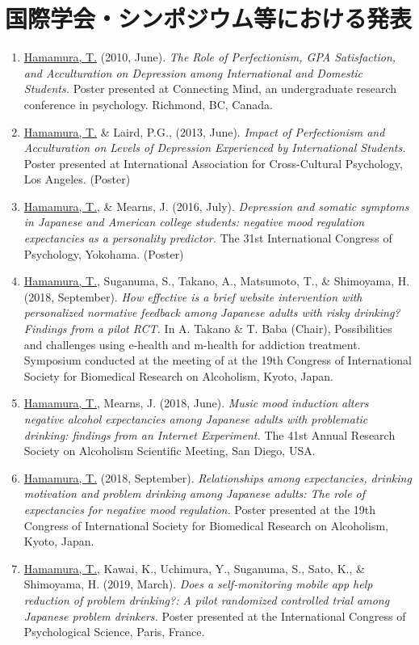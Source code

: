 \documentclass[11pt,a4paper]{article}
\begin{document}
\section{国際学会・シンポジウム等における発表}
\begin{enumerate}
	\item \underline{Hamamura, T.} (2010, June). \textit{The Role of Perfectionism, GPA Satisfaction, and Acculturation on Depression among International and Domestic Students.} Poster presented at Connecting Mind, an undergraduate research conference in psychology. Richmond, BC, Canada.
	\item \underline{Hamamura, T.} \& Laird, P.G., (2013, June). \textit{Impact of Perfectionism and Acculturation on Levels of Depression Experienced by International Students.} Poster presented at International Association for Cross-Cultural Psychology, Los Angeles. (Poster)
	\item \underline{Hamamura, T.}, \& Mearns, J. (2016, July). \textit{Depression and somatic symptoms in Japanese and American college students: negative mood regulation expectancies as a personality predictor.} The 31st International Congress of Psychology, Yokohama. (Poster)
	\item \underline{Hamamura, T.}, Suganuma, S., Takano, A., Matsumoto, T., \& Shimoyama, H. (2018, September). \textit{How effective is a brief website intervention with personalized normative feedback among Japanese adults with risky drinking? Findings from a pilot RCT.} In A. Takano \& T. Baba (Chair), Possibilities and challenges using e-health and m-health for addiction treatment. Symposium conducted at the meeting of at the 19th Congress of International Society for Biomedical Research on Alcoholism, Kyoto, Japan.
	\item \underline{Hamamura, T.}, Mearns, J. (2018, June). \textit{Music mood induction alters negative alcohol expectancies among Japanese adults with problematic drinking: findings from an Internet Experiment.} The 41st Annual Research Society on Alcoholism Scientific Meeting, San Diego, USA.
	\item \underline{Hamamura, T.} (2018, September). \textit{Relationships among expectancies, drinking motivation and problem drinking among Japanese adults: The role of expectancies for negative mood regulation.} Poster presented at the 19th Congress of International Society for Biomedical Research on Alcoholism, Kyoto, Japan.
	\item \underline{Hamamura, T.}, Kawai, K., Uchimura, Y., Suganuma, S., Sato, K., \& Shimoyama, H. (2019, March). \textit{Does a self-monitoring mobile app help reduction of problem drinking?: A pilot randomized controlled trial among Japanese problem drinkers.} Poster presented at the International Congress of Psychological Science, Paris, France.

\end{enumerate}
\end{document}
